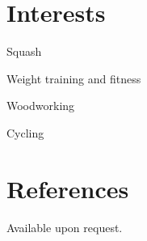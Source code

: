 \documentclass[line,margin]{res}
\begin{document}
\begin{resume}
        \section{Interests}
        \begin{list}{}{\leftmargin=1em \itemsep=-2pt}
            \item{Squash}
            \item{Weight training and fitness}
            \item{Woodworking}
            \item{Cycling}
        \end{list}

        \section{References}
        Available upon request.
    \end{resume}
\end{document}
